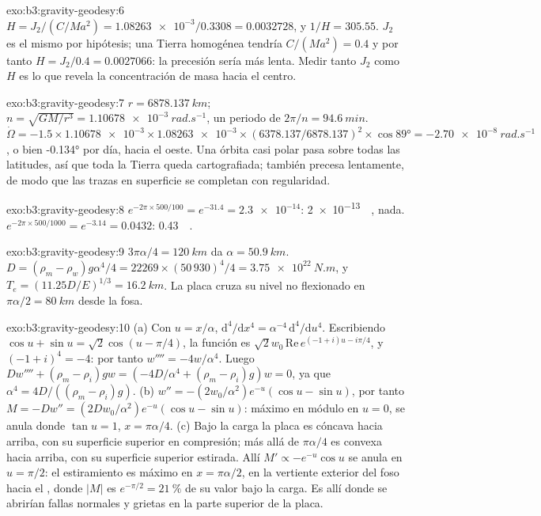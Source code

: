 \begin{solution}{exo:b3:gravity-geodesy:6}
$H = J_2/(C/Ma^2) = \num{1.08263e-3}/0.3308 = \num{0.0032728}$, y
$1/H = 305.55$. $J_2$ es el mismo por hipótesis; una Tierra homogénea tendría
$C/(Ma^2) = 0.4$ y por tanto $H = J_2/0.4 = \num{0.0027066}$: la precesión sería
más lenta. Medir tanto $J_2$ como $H$ es lo que revela la concentración de masa
hacia el centro.
\end{solution}

\begin{solution}{exo:b3:gravity-geodesy:7}
$r = \qty{6878.137}{km}$; $n = \sqrt{GM/r^3} = \qty{1.10678e-3}{rad.s^{-1}}$, un
periodo de $2\pi/n = \qty{94.6}{min}$. $\dot\Omega = -1.5\times\num{1.10678e-3}
\times\num{1.08263e-3}\times(6378.137/6878.137)^2\times\cos\ang{89} =
\qty{-2.70e-8}{rad.s^{-1}}$, o bien \ang{-0.134} por día, hacia el oeste. Una órbita casi polar
pasa sobre todas las latitudes, así que toda la Tierra queda cartografiada; también precesa
lentamente, de modo que las trazas en superficie se completan con regularidad.
\end{solution}

\begin{solution}{exo:b3:gravity-geodesy:8}
$e^{-2\pi\times500/100} = e^{-31.4} = \num{2.3e-14}$: \qty{2e-13}{\milli\gal},
nada. $e^{-2\pi\times500/1000} = e^{-3.14} = 0.0432$:
\qty{0.43}{\milli\gal}.
\end{solution}

\begin{solution}{exo:b3:gravity-geodesy:9}
$3\pi\alpha/4 = \qty{120}{km}$ da $\alpha = \qty{50.9}{km}$.
$D = (\rho_m - \rho_w)g\alpha^4/4 = 22269\times(50\,930)^4/4 =
\qty{3.75e22}{N.m}$, y $T_e = (11.25D/E)^{1/3} = \qty{16.2}{km}$. La placa
cruza su nivel no flexionado en $\pi\alpha/2 = \qty{80}{km}$ desde la fosa.
\end{solution}

\begin{solution}{exo:b3:gravity-geodesy:10}
(a) Con $u = x/\alpha$, $\mathrm d^4/\mathrm dx^4 = \alpha^{-4}\,\mathrm
d^4/\mathrm du^4$. Escribiendo $\cos u + \sin u = \sqrt2\cos(u - \pi/4)$, la
función es $\sqrt2w_0\,\mathrm{Re}\,e^{(-1 + i)u - i\pi/4}$, y
$(-1 + i)^4 = -4$: por tanto $w'''' = -4w/\alpha^4$. Luego $Dw'''' + (\rho_m -
\rho_i)gw = (-4D/\alpha^4 + (\rho_m - \rho_i)g)w = 0$, ya que $\alpha^4 =
4D/((\rho_m - \rho_i)g)$. (b) $w'' = -(2w_0/\alpha^2)e^{-u}(\cos u - \sin u)$, por tanto
$M = -Dw'' = (2Dw_0/\alpha^2)e^{-u}(\cos u - \sin u)$: máximo en módulo en
$u = 0$, se anula donde $\tan u = 1$, $x = \pi\alpha/4$. (c) Bajo la carga la
placa es cóncava hacia arriba, con su superficie superior en compresión; más allá de $\pi\alpha/4$
es convexa hacia arriba, con su superficie superior estirada. Allí $M' \propto
-e^{-u}\cos u$ se anula en $u = \pi/2$: el estiramiento es máximo en
$x = \pi\alpha/2$, en la vertiente exterior del foso hacia el , donde
$|M|$ es $e^{-\pi/2} = \qty{21}{\percent}$ de su valor bajo la carga. Es allí
donde se abrirían fallas normales y grietas en la parte superior de la placa.
\end{solution}

